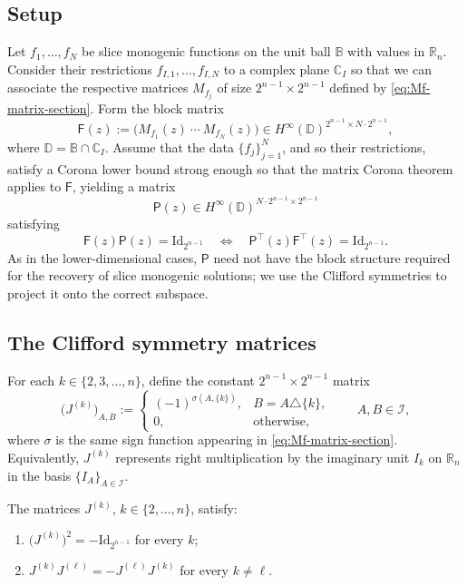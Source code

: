 \documentclass[11pt]{amsart}
\begin{document}
\subsection{Setup}

Let $f_{1}, \ldots, f_{N}$ be slice monogenic functions on the unit ball $\mathbb B$ with values in $\mathbb{R}_n$. Consider their restrictions $f_{I,1}, \ldots, f_{I,N}$ to a complex plane $\mathbb C_I$ so that we can associate the respective matrices $M_{f_j}$ of size $2^{n-1}\times 2^{n-1}$ defined by \eqref{eq:Mf-matrix-section}. Form the block matrix
\[
\mathsf{F}(z) := \bigl(M_{f_1}(z)\ \cdots\ M_{f_N}(z)\bigr) \in H^\infty(\mathbb{D})^{2^{n-1}\times N\cdot 2^{n-1}},
\]
where $\mathbb{D}=\mathbb{B}\cap\mathbb{C}_I$.
Assume that the data $\{f_{j}\}_{j=1}^N$, and so their restrictions, satisfy a Corona lower bound strong enough so that the matrix Corona theorem applies to $\mathsf{F}$, yielding a matrix
\[
\mathsf{P}(z) \in H^\infty(\mathbb{D})^{N\cdot 2^{n-1} \times 2^{n-1}}
\]
satisfying
\begin{equation}\label{eq:right_inverse_P_general}
\mathsf{F}(z) \mathsf{P}(z) = \mathrm{Id}_{2^{n-1}} \quad\Longleftrightarrow\quad \mathsf{P}^{\top}(z) \mathsf{F}^{\top}(z) = \mathrm{Id}_{2^{n-1}}.
\end{equation}
As in the lower-dimensional cases, $\mathsf{P}$ need not have the block structure required for the recovery of slice monogenic solutions; we use the Clifford symmetries to project it onto the correct subspace.

\subsection{The Clifford symmetry matrices}

For each $k \in \{2, 3, \ldots, n\}$, define the constant $2^{n-1} \times 2^{n-1}$ matrix
\begin{equation}\label{eq:J_general_def}
\bigl(J^{(k)}\bigr)_{A,B} := \begin{cases}
(-1)^{\sigma(A,\{k\})}, & B = A \triangle \{k\},\\
0, & \text{otherwise,}
\end{cases}
\qquad A, B \in \mathcal I,
\end{equation}
where $\sigma$ is the same sign function appearing in \eqref{eq:Mf-matrix-section}. Equivalently, $J^{(k)}$ represents right multiplication by the imaginary unit $I_k$ on $\mathbb{R}_n$ in the basis $\{I_A\}_{A \in \mathcal I}$.

\begin{lemma}\label{lem:J-properties}
The matrices $J^{(k)}$, $k \in \{2,\ldots,n\}$, satisfy:
\begin{enumerate}
\item $\bigl(J^{(k)}\bigr)^2 = -\mathrm{Id}_{2^{n-1}}$ for every $k$;
\item $J^{(k)} J^{(\ell)} = -J^{(\ell)} J^{(k)}$ for every $k \ne \ell$.
\end{enumerate}
\end{lemma}
\end{document}
